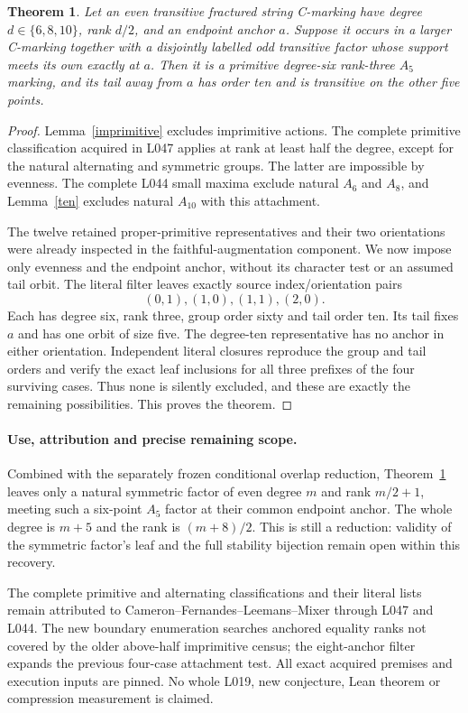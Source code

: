 \documentclass[11pt,a4paper]{article}
\newtheorem{theorem}[lemma]{Theorem}
\begin{document}
\begin{theorem}\label{small}
Let an even transitive fractured string C-marking have degree
$d\in\{6,8,10\}$, rank $d/2$, and an endpoint anchor $a$.
Suppose it occurs in a larger C-marking together with a disjointly
labelled odd transitive factor whose support meets its own exactly
at $a$. Then it is a primitive degree-six rank-three $A_5$ marking,
and its tail away from $a$ has order ten and is transitive on the
other five points.
\end{theorem}
\begin{proof}
Lemma~\ref{imprimitive} excludes imprimitive actions. The complete
primitive classification acquired in L047 applies at rank at least
half the degree, except for the natural alternating and symmetric
groups. The latter are impossible by evenness. The complete L044
small maxima exclude natural $A_6$ and $A_8$, and
Lemma~\ref{ten} excludes natural $A_{10}$ with this attachment.

The twelve retained proper-primitive representatives and their two
orientations were already inspected in the faithful-augmentation
component. We now impose only evenness and the endpoint anchor,
without its character test or an assumed tail orbit. The literal
filter leaves exactly source index/orientation pairs
\[
                         (0,1),(1,0),(1,1),(2,0).
\]
Each has degree six, rank three, group order sixty and tail order ten.
Its tail fixes $a$ and has one orbit of size five. The degree-ten
representative has no anchor in either orientation. Independent literal
closures reproduce the group and tail orders and verify the exact
leaf inclusions for all three prefixes of the four surviving cases.
Thus none is silently excluded, and these are exactly the remaining
possibilities. This proves the theorem.
\end{proof}

\paragraph{Use, attribution and precise remaining scope.}
Combined with the separately frozen conditional overlap reduction,
Theorem~\ref{small} leaves only a natural symmetric factor of even
degree $m$ and rank $m/2+1$, meeting such a six-point $A_5$ factor
at their common endpoint anchor. The whole degree is $m+5$ and
the rank is $(m+8)/2$. This is still a reduction: validity of the
symmetric factor's leaf and the full stability bijection remain open
within this recovery.

The complete primitive and alternating classifications and their
literal lists remain attributed to Cameron--Fernandes--Leemans--Mixer
through L047 and L044. The new boundary enumeration searches anchored
equality ranks not covered by the older above-half imprimitive census;
the eight-anchor filter expands the previous four-case attachment test.
All exact acquired premises and execution inputs are pinned. No whole
L019, new conjecture, Lean theorem or compression measurement is claimed.
\end{document}
